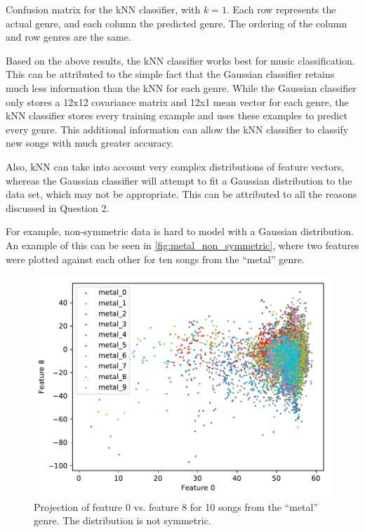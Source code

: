 \documentclass[a4paper,titlepage]{article}
\begin{document}
	\begin{table}[!htb]
		\centering
		\caption{Confusion matrix for the kNN classifier, with $k = 1$. Each row represents the actual genre, and each column the predicted genre. The ordering of the column and row genres are the same.}
		\label{table:confusion_knn_1}
	\end{table}
	
	Based on the above results, the kNN classifier works best for music classification. This can be attributed to the simple fact that the Gaussian classifier retains much less information than the kNN for each genre. While the Gaussian classifier only stores a 12x12 covariance matrix and 12x1 mean vector for each genre, the kNN classifier stores every training example and uses these examples to predict every genre. This additional information can allow the kNN classifier to classify new songs with much greater accuracy. 
	
	Also, kNN can take into account very complex distributions of feature vectors, whereas the Gaussian classifier will attempt to fit a Gaussian distribution to the data set, which may not be appropriate. This can be attributed to all the reasons discussed in Question 2.
	
	For example, non-symmetric data is hard to model with a Gaussian distribution. An example of this can be seen in \autoref{fig:metal_non_symmetric}, where two features were plotted against each other for ten songs from the ``metal'' genre.
	
	
	\begin{figure}[!htb]
		\centering
		\includegraphics[width=\columnwidth]{plots/metal_non_symmetric.pdf}
		\caption
		{Projection of feature 0 vs. feature 8 for 10 songs from the ``metal'' genre. The distribution is not symmetric.}
		\label{fig:metal_non_symmetric}
	\end{figure}
\end{document}
